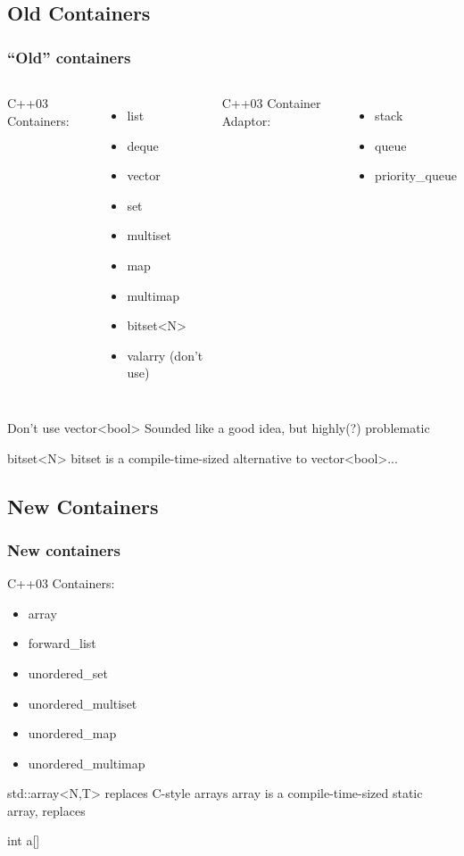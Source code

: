 \subsection{Old Containers}
\begin{frame}[fragile]
\frametitle{``Old'' containers}
\begin{columns}[t]
C++03 Containers:
\begin{itemize}
\item list
\item deque
\item vector
\item set
\item multiset
\item map
\item multimap
\item bitset<N>
\item valarry (don't use)
\end{itemize}
\pause{}

C++03 Container Adaptor:
\begin{itemize}
\item stack
\item queue
\item priority\_queue
\end{itemize}
\end{columns}
\begin{alertblock}{Don't use vector<bool>}
Sounded like a good idea, but highly(?) problematic
\end{alertblock}
\begin{block}{bitset<N>}
bitset is a compile-time-sized alternative to vector<bool>...
\end{block}


\end{frame}

\subsection{New Containers}

\begin{frame}[fragile]
\frametitle{New  containers}
C++03 Containers:
\begin{itemize}
\item array
\item forward\_list
\item unordered\_set
\item unordered\_multiset
\item unordered\_map
\item unordered\_multimap

\end{itemize}
\begin{exampleblock}{std::array<N,T> replaces C-style arrays}
array is a compile-time-sized static array, replaces

\hskip 2in
int a[]
\end{exampleblock}
\end{frame}


